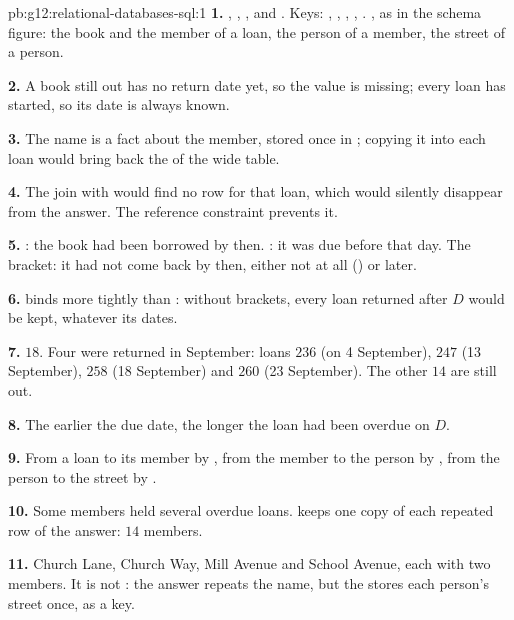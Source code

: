 \begin{solution}{pb:g12:relational-databases-sql:1}
\textbf{1.} , , ,  and . Keys: ,
, , , . , as in the schema figure: the
book and the member of a loan, the person of a member, the street of a person.

\textbf{2.} A book still out has no return date yet, so the value is missing; every loan has started, so its date is
always known.

\textbf{3.} The name is a fact about the member, stored once in ; copying it into each loan would bring
back the  of the wide table.

\textbf{4.} The join with  would find no row for that loan, which would silently disappear from the
answer. The reference constraint prevents it.

\textbf{5.} : the book had been borrowed by then. : it was due before that day.
The bracket: it had not come back by then, either not at all () or later.

\textbf{6.}  binds more tightly than : without brackets, every loan returned after $D$ would be kept,
whatever its dates.

\textbf{7.} $18$. Four were returned in September: loans $236$ (on 4 September), $247$ (13 September), $258$ (18
September) and $260$ (23 September). The other $14$ are still out.

\textbf{8.} The earlier the due date, the longer the loan had been overdue on $D$.

\textbf{9.} From a loan to its member by , from the member to the person by , from
the person to the street by .

\textbf{10.} Some members held several overdue loans.  keeps one copy of each repeated row of the
answer: $14$ members.

\textbf{11.} Church Lane, Church Way, Mill Avenue and School Avenue, each with two members. It is not : the
answer repeats the name, but the  stores each person's street once, as a key.


\end{solution}
